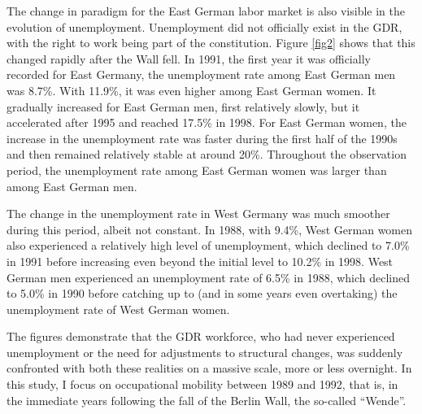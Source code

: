 \begin{Article}
\begin{refsection}[Spitz]
The change in paradigm for the East German labor market is also visible in the evolution of unemployment. Unemployment did not officially exist in the GDR, with the right to work being part of the constitution.  Figure \ref{fig2} shows that this changed rapidly after the Wall fell. In 1991, the first year it was officially recorded for East Germany, the unemployment rate among East German men was 8.7\%. With 11.9\%, it was even higher among East German women. It gradually increased for East German men, first relatively slowly, but it accelerated after 1995 and reached 17.5\% in 1998. For East German women, the increase in the unemployment rate was faster during the first half of the 1990s and then remained relatively stable at around 20\%. Throughout the observation period, the unemployment rate among East German women was larger than among East German men.

The change in the unemployment rate in West Germany was much smoother during this period, albeit not constant. In 1988, with 9.4\%, West German women also experienced a relatively high level of unemployment, which declined to 7.0\% in 1991 before increasing even beyond the initial level to 10.2\% in 1998. West German men experienced an unemployment rate of 6.5\% in 1988, which declined to 5.0\% in 1990 before catching up to (and in some years even overtaking) the unemployment rate of West German women. 


The figures demonstrate that the GDR workforce, who had never experienced unemployment or the need for adjustments to structural changes, was suddenly confronted with both these realities on a massive scale, more or less overnight. In this study, I focus on occupational mobility between 1989 and 1992, that is, in the immediate years following the fall of the Berlin Wall, the so-called ``Wende''.


\end{refsection}
\end{Article}
